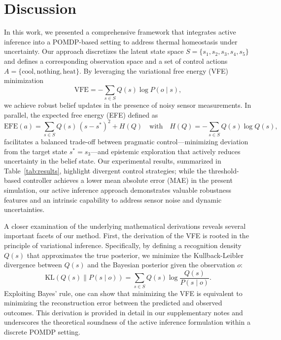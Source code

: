 \documentclass[11pt]{article}
\begin{document}
\section{Discussion}
In this work, we presented a comprehensive framework that integrates active inference into a POMDP-based setting to address thermal homeostasis under uncertainty. Our approach discretizes the latent state space \(S=\{s_1, s_2, s_3, s_4, s_5\}\) and defines a corresponding observation space and a set of control actions \(A=\{\text{cool}, \text{nothing}, \text{heat}\}\). By leveraging the variational free energy (VFE) minimization
\[
\text{VFE} = -\sum_{s \in S} Q(s) \log P(o \mid s),
\]
we achieve robust belief updates in the presence of noisy sensor measurements. In parallel, the expected free energy (EFE) defined as
\[
\mathrm{EFE}(a) = \sum_{s \in S} Q(s)\,(s-s^*)^2 + H(Q) \quad \text{with} \quad H(Q) = -\sum_{s \in S} Q(s)\log Q(s),
\]
facilitates a balanced trade-off between pragmatic control—minimizing deviation from the target state \(s^*=s_3\)—and epistemic exploration that actively reduces uncertainty in the belief state. Our experimental results, summarized in Table~\ref{tab:results}, highlight divergent control strategies; while the threshold-based controller achieves a lower mean absolute error (MAE) in the present simulation, our active inference approach demonstrates valuable robustness features and an intrinsic capability to address sensor noise and dynamic uncertainties.

A closer examination of the underlying mathematical derivations reveals several important facets of our method. First, the derivation of the VFE is rooted in the principle of variational inference. Specifically, by defining a recognition density \(Q(s)\) that approximates the true posterior, we minimize the Kullback-Leibler divergence between \(Q(s)\) and the Bayesian posterior given the observation \(o\):
\[
\mathrm{KL}(Q(s)\parallel P(s\mid o)) = \sum_{s \in S} Q(s) \log \frac{Q(s)}{P(s\mid o)}.
\]
Exploiting Bayes’ rule, one can show that minimizing the VFE is equivalent to minimizing the reconstruction error between the predicted and observed outcomes. This derivation is provided in detail in our supplementary notes and underscores the theoretical soundness of the active inference formulation within a discrete POMDP setting.
\end{document}
